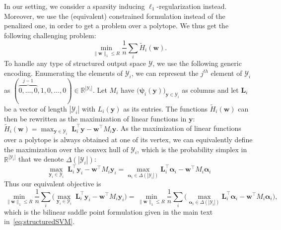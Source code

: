 \documentclass[twoside]{article}
\newcommand{\R}{\mathbb{R}}
\newcommand{\Y}{\mathcal{Y}}
\newcommand{\y}{\bm{y}}
\newcommand{\0}{\mathbf{0}} %
\begin{document}
  In our setting, we consider a sparsity inducing $\ell_1$-regularization instead. Moreover, we use the (equivalent) constrained formulation instead of the penalized one, in order to get a problem over a polytope. We thus get the following challenging problem:
  \begin{equation}
    \min_{\|\bm{w}\|_1  \leq R} \frac{1}{n} \sum_i \tilde H_i(\bm{w}).
  \end{equation}
  To handle any type of structured output space $\Y$, we use the following generic encoding.
  Enumerating the elements of $\Y_i$, we can represent the $j^{th}$ element of $\Y_i$ as $(\overbrace{0,\ldots,0}^{j-1},1,0,\ldots,0 ) \in \R^{|\Y_i|}$. Let $M_i$ have $\big(\bm{\psi}_i(\y)\big)_{\y \in \mathcal Y_i}$ as columns and let $\bm{L}_i$ be a vector of length $|\Y_i|$ with $L_i(\y)$ as its entries. 
  The functions $\tilde H_i(\bm{w})$ can then be rewritten as the maximization of linear functions in $\y$: $\tilde H_i(\bm{w}) = \max_{\y \in \mathcal Y_i} \; \bm{L}_i^\top \y - \bm{w}^\top M_i \y$.
  As the maximization of linear functions over a polytope is always obtained at one of its vertex, we can equivalently define the maximization over the convex hull of $\Y_i$, which is the probability simplex in $\R^{|\Y_i|}$ that we denote $\Delta(|\Y_i|)$: 
  \begin{equation}
    \max_{\y_i \in \mathcal Y_i} \; \bm{L}_i^\top \y_i - \bm{w}^\top M_i \y_i =  \max_{\bm{\alpha}_i \in \Delta(|\mathcal Y_i|)} \!\!\bm{L}_i^\top \bm{\alpha}_i - \bm{w}^\top M_i \bm{\alpha}_i
  \end{equation}
  Thus our equivalent objective is 
  \begin{equation}
   \min_{\|\bm{w}\|_1  \leq R} \frac{1}{n} \sum_i \Big( \max_{\y_i \in \mathcal Y_i} \; \bm{L}_i^\top \y_i - \bm{w}^\top M_i \y_i \Big) 
    = 
    \min_{\|\bm{w}\|_1 \leq R} \frac{1}{n} \sum_i \Big( \max_{\bm{\alpha}_i \in \Delta(|\mathcal Y_i|)} \!\!\bm{L}_i^\top \bm{\alpha}_i - \bm{w}^\top M_i \bm{\alpha}_i \Big) ,
  \end{equation}
  which is the bilinear saddle point formulation given in the main text in~\eqref{eq:structuredSVM}.
%
%
%
%

  

\bigskip
\bigskip
%
\end{document}
